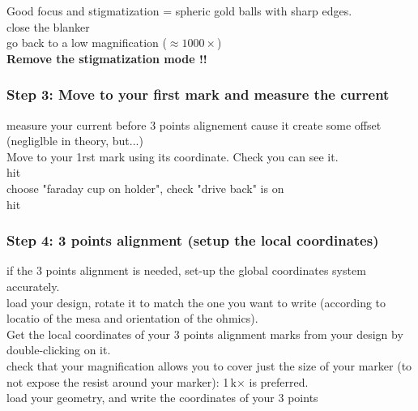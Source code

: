 \documentclass[12pt,a4paper]{report}
\begin{document}
\begin{enumerate}
Good focus and stigmatization = spheric gold balls with sharp edges.\\

close the blanker\\

go back to a low magnification ($\approx 1000 \times$)\\

\textbf{Remove the stigmatization mode !!}\\


\subsubsection{Step 3: Move to your first mark and measure the current}
measure your current before 3 points alignement cause it create some offset (negliglble in theory, but...)\\

Move to your 1rst mark using its coordinate. Check you can see it.\\

hit \\

choose "faraday cup on holder", check "drive back" is on\\

hit \\



\subsubsection{Step 4: 3 points alignment (setup the local coordinates)}

if the 3 points alignment is needed, set-up the global coordinates system accurately.\\

load your design, rotate it to match the one you want to write (according to locatio of the mesa and orientation of the ohmics).\\

Get the local coordinates of your 3 points alignment marks from your design by double-clicking on it.\\

check that your magnification allows you to cover just the size of your marker (to not expose the resist around your marker): 1\,k$\times$ is preferred.\\

load your geometry, and write the coordinates of your 3 points\\


\end{enumerate}
\end{document}
